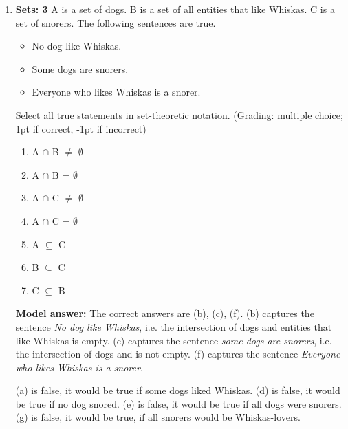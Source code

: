 \documentclass[a4,11pt]{article}
\begin{document}
\begin{enumerate}[leftmargin = 12pt]
{\bf Model answer:} The correct answer is left downward monotone. If \textit{All dogs love walks} is true, then it means that \textit{all chihuahuas love walks} is also true. Since chihuahuas is a subset of dogs, \textit{all} is left downward monotone. If \textit{All dogs love walks} is true, it does not entail that \textit{all dogs love walks in a park} is true. Some dogs might prefer walks in a city center. Therefore, \textit{all} is not right downward monotone.

\item {\bf Sets: 3}  A is a set of dogs. B is a set of all entities that like Whiskas. C is a set of snorers. The following sentences are true. 

\begin{itemize}[noitemsep]
\item No dog like Whiskas.
\item Some dogs are snorers.
\item Everyone who likes Whiskas is a snorer.
\end{itemize}

Select all true statements in set-theoretic notation. (Grading: multiple choice; 1pt if correct, -1pt if incorrect)

\begin{enumerate}
\item A $\cap$ B $\neq$ $\emptyset$
\item A $\cap$ B = $\emptyset$
\item A $\cap$ C $\neq$ $\emptyset$
\item A $\cap$ C = $\emptyset$
\item A $\subseteq$ C 
\item B $\subseteq$ C 
\item C $\subseteq$ B
\end{enumerate}

{\bf Model answer:} The correct answers are (b), (c), (f). (b) captures the sentence \textit{No dog like Whiskas}, i.e. the intersection of dogs and entities that like Whiskas is empty. (c) captures the sentence \textit{some dogs are snorers}, i.e. the intersection of dogs and is not empty. (f) captures the sentence \textit{Everyone who likes Whiskas is a snorer}.

(a) is false, it would be true if some dogs liked Whiskas. (d) is false, it would be true if no dog snored. (e) is false, it would be true if all dogs were snorers. (g) is false, it would be true, if all snorers would be Whiskas-lovers.

\end{enumerate}
\end{document}
